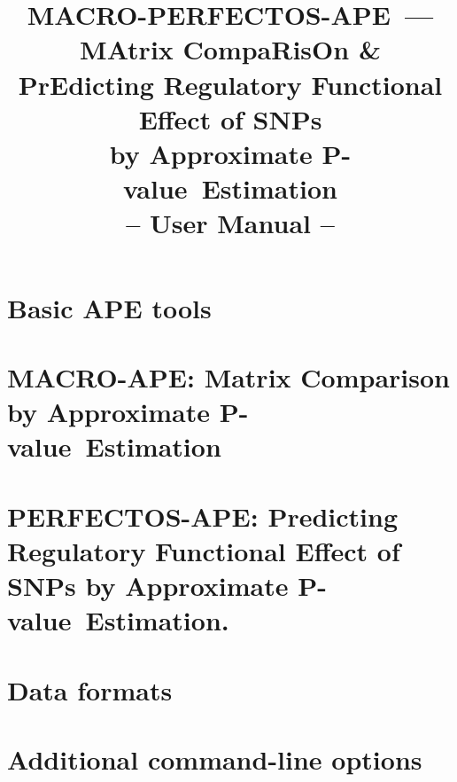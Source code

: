 \documentclass[]{article}
\newcommand*{\pvalue}{\mbox{P-value}}
\begin{document}
\title{
MACRO-PERFECTOS-APE~---\\{\small MAtrix CompaRisOn \&\\ PrEdicting Regulatory Functional Effect of SNPs\\ by Approximate \pvalue\ Estimation}\\
-- User Manual --
}
\maketitle








\section{Basic APE tools}







\section{MACRO-APE: Matrix Comparison by Approximate \pvalue\ Estimation}






\section{PERFECTOS-APE: Predicting Regulatory Functional Effect of SNPs by Approximate \pvalue\ Estimation.}





\section{Data formats}




\section{Additional command-line options}


\end{document}
